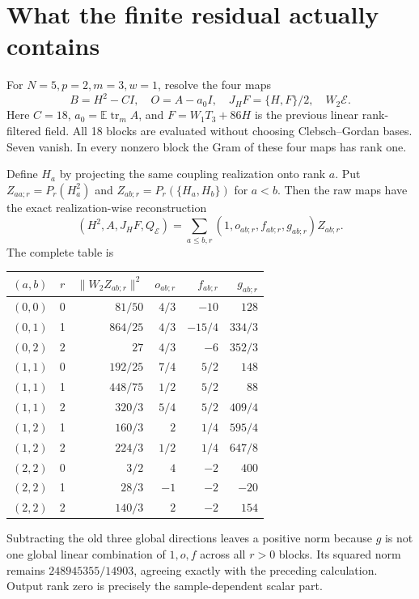 \documentclass[11pt,a4paper]{article}
\newcommand{\EE}{\mathbb E}
\newcommand{\core}{\mathcal E}
\DeclareMathOperator{\tr}{tr}
\begin{document}
\newpage
\section{What the finite residual actually contains}
For $N=5,p=2,m=3,w=1$, resolve the four maps
\begin{equation}
 B=H^2-CI,\quad O=A-a_0I,\quad J_HF=\{H,F\}/2,
 \quad W_2\core.
\end{equation}
Here $C=18$, $a_0=\EE\tr_m A$, and $F=W_1T_3+86H$ is the
previous linear rank-filtered field. All 18 blocks are evaluated
without choosing Clebsch--Gordan bases. Seven vanish. In every
nonzero block the Gram of these four maps has rank one.

Define $H_a$ by projecting the same coupling realization onto
rank $a$. Put
$Z_{aa;r}=P_r(H_a^2)$ and
$Z_{ab;r}=P_r(\{H_a,H_b\})$ for $a<b$.
Then the raw maps have the exact realization-wise reconstruction
\begin{equation}
 (H^2,A,J_HF,Q_\core)
      =\sum_{a\le b,r}(1,o_{ab;r},f_{ab;r},g_{ab;r})Z_{ab;r}.
 \label{eq:filters}
\end{equation}
The complete table is
\begin{center}
\begin{tabular}{ccrrrr}
\toprule
$(a,b)$ & $r$ & $\|W_2Z_{ab;r}\|^2$ & $o_{ab;r}$ & $f_{ab;r}$ & $g_{ab;r}$\\
\midrule
$(0,0)$&0&$81/50$&$4/3$&$-10$&$128$\\
$(0,1)$&1&$864/25$&$4/3$&$-15/4$&$334/3$\\
$(0,2)$&2&$27$&$4/3$&$-6$&$352/3$\\
$(1,1)$&0&$192/25$&$7/4$&$5/2$&$148$\\
$(1,1)$&1&$448/75$&$1/2$&$5/2$&$88$\\
$(1,1)$&2&$320/3$&$5/4$&$5/2$&$409/4$\\
$(1,2)$&1&$160/3$&$2$&$1/4$&$595/4$\\
$(1,2)$&2&$224/3$&$1/2$&$1/4$&$647/8$\\
$(2,2)$&0&$3/2$&$4$&$-2$&$400$\\
$(2,2)$&1&$28/3$&$-1$&$-2$&$-20$\\
$(2,2)$&2&$140/3$&$2$&$-2$&$154$\\
\bottomrule
\end{tabular}
\end{center}
Subtracting the old three global directions leaves a positive norm
because $g$ is not one global linear combination of $1,o,f$ across
all $r>0$ blocks. Its squared norm remains
$248945355/14903$, agreeing exactly with the preceding calculation.
Output rank zero is precisely the sample-dependent scalar part.
\end{document}

